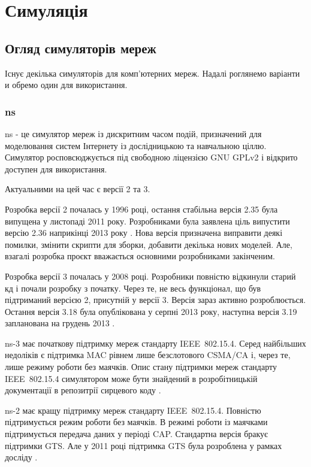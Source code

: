 \documentclass[a4paper,ukrainian,utf8,nocolumnsxix,floatsection]{eskdtext}
\renewcommand\paragraph{\subsubsection}
\let\stdsection\section
\renewcommand\section{\clearpage\stdsection}
\newcommand{\iee}[0]{IEEE~802.15.4\xspace}
\newcommand{\csma}[0]{CSMA/CA\xspace}
\begin{document}
\section{Симуляція}

\subsection{Огляд симуляторів мереж}

Існує декілька симуляторів для комп'ютерних мереж. Надалі роглянемо варіанти и обремо один для використання.

\paragraph{ns}

ns - це симулятор мереж із дискритним часом подій, призначений для моделювання систем Інтернету із дослідницькою та навчальною ціллю. Симулятор росповсюджується під свободною ліцензією GNU GPLv2 і відкрито доступен для використання.

Актуальними на цей час є версії 2 та 3. 

Розробка версії 2 почалась у 1996 році, остання стабільна версія 2.35 була випущена у листопаді 2011 року. Розробниками була заявлена ціль випустити версію 2.36 наприкінці 2013 року . Нова версія призначена виправити деякі помилки, змінити скрипти для зборки, добавити декілька нових моделей. Але, взагалі розробка проєкт вважається основними розробниками закінченим.

Розробка версії 3 почалась у 2008 році. Розробники повністю відкинули старий кд і почали розробку з початку. Через те, не весь функціонал, що був підтриманий версією 2, присутній у версії 3. Версія зараз активно розроблюється. Остання версія 3.18 була опублікована у серпні 2013 року, наступна версія 3.19 запланована на грудень 2013 .  

ns-3 має початкову підтримку мереж стандарту \iee. Серед найбільших недоліків є підтримка MAC рівнем лише безслотового \csma і, через те, лише режиму роботи без маячків. Опис стану підтримки мереж стандарту \iee симулятором може бути знайдений в розробітницькій  документації в репозитрії сирцевого коду .

ns-2 має кращу підтримку мереж стандарту \iee. Повністю підтримується режим роботи без маячків. В режимі роботи із маячками підтримується передача даних у періоді CAP. Стандартна версія бракує підтримки GTS. Але у 2011 році підтримка GTS була розроблена у рамках досліду .
\end{document}
